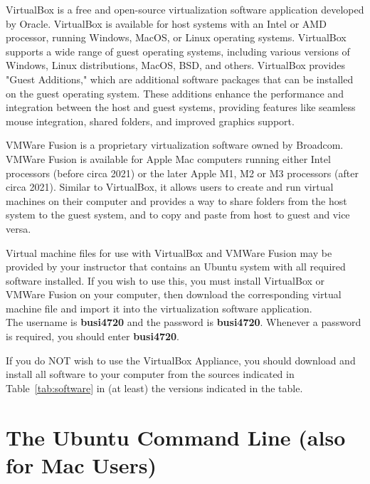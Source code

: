 VirtualBox is a free and open-source virtualization software application developed by Oracle. VirtualBox is available for host systems with an Intel or AMD processor, running Windows, MacOS, or Linux operating systems. VirtualBox supports a wide range of guest operating systems, including various versions of Windows, Linux distributions, MacOS, BSD, and others. VirtualBox provides "Guest Additions," which are additional software packages that can be installed on the guest operating system. These additions enhance the performance and integration between the host and guest systems, providing features like seamless mouse integration, shared folders, and improved graphics support. 

VMWare Fusion is a proprietary virtualization software owned by Broadcom. VMWare Fusion is available for Apple Mac computers running either Intel processors (before circa 2021) or the later Apple M1, M2 or M3 processors (after circa 2021). Similar to VirtualBox, it allows users to create and run virtual machines on their computer and provides a way to share folders from the host system to the guest system, and to copy and paste from host to guest and vice versa. \\
 
\begin{alertbox}
Virtual machine files for use with VirtualBox and VMWare Fusion may be provided by your instructor that contains an Ubuntu system with all required software installed. If you wish to use this, you must install VirtualBox or VMWare Fusion on your computer, then download the corresponding virtual machine file and import it into the virtualization software application.  \\

The username is \textbf{busi4720} and the password is \textbf{busi4720}. Whenever a password is required, you should enter \textbf{busi4720}.
\end{alertbox}
  
\begin{alertbox}
If you do NOT wish to use the VirtualBox Appliance, you should download and install all software to your computer from the sources indicated in Table~\ref{tab:software} in (at least) the versions indicated in the table.
\end{alertbox}
 
\section{The Ubuntu Command Line (also for Mac Users)}


